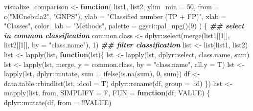 \documentclass[
]{article}
\newenvironment{Shaded}{\begin{snugshade}}{\end{snugshade}}
\newcommand{\AttributeTok}[1]{\textcolor[rgb]{0.77,0.63,0.00}{#1}}
\newcommand{\ControlFlowTok}[1]{\textcolor[rgb]{0.13,0.29,0.53}{\textbf{#1}}}
\newcommand{\DecValTok}[1]{\textcolor[rgb]{0.00,0.00,0.81}{#1}}
\newcommand{\DocumentationTok}[1]{\textcolor[rgb]{0.56,0.35,0.01}{\textbf{\textit{#1}}}}
\newcommand{\FunctionTok}[1]{\textcolor[rgb]{0.00,0.00,0.00}{#1}}
\newcommand{\NormalTok}[1]{#1}
\newcommand{\OtherTok}[1]{\textcolor[rgb]{0.56,0.35,0.01}{#1}}
\newcommand{\SpecialCharTok}[1]{\textcolor[rgb]{0.00,0.00,0.00}{#1}}
\newcommand{\StringTok}[1]{\textcolor[rgb]{0.31,0.60,0.02}{#1}}
\begin{document}
\begin{Shaded}
\begin{Highlighting}[]
\NormalTok{visualize\_comparison }\OtherTok{\textless{}{-}} 
  \ControlFlowTok{function}\NormalTok{(}
\NormalTok{    list1,}
\NormalTok{    list2,}
    \AttributeTok{ylim\_min =} \DecValTok{50}\NormalTok{,}
    \AttributeTok{from =} \FunctionTok{c}\NormalTok{(}\StringTok{"MCnebula2"}\NormalTok{, }\StringTok{"GNPS"}\NormalTok{),}
    \AttributeTok{ylab =} \StringTok{"Classified number (TP + FP)"}\NormalTok{,}
    \AttributeTok{xlab =} \StringTok{"Classes"}\NormalTok{,}
    \AttributeTok{color\_lab =} \StringTok{"Methods"}\NormalTok{,}
    \AttributeTok{palette =}\NormalTok{ ggsci}\SpecialCharTok{::}\FunctionTok{pal\_npg}\NormalTok{()(}\DecValTok{9}\NormalTok{)}
\NormalTok{    )}
\NormalTok{  \{}
    \DocumentationTok{\#\# select in common classification}
\NormalTok{    common.class }\OtherTok{\textless{}{-}}\NormalTok{ dplyr}\SpecialCharTok{::}\FunctionTok{select}\NormalTok{(}\FunctionTok{merge}\NormalTok{(list1[[}\DecValTok{1}\NormalTok{]], list2[[}\DecValTok{1}\NormalTok{]], }\AttributeTok{by =} \StringTok{"class.name"}\NormalTok{), }\DecValTok{1}\NormalTok{)}
    \DocumentationTok{\#\# filter classification}
\NormalTok{    list }\OtherTok{\textless{}{-}} \FunctionTok{list}\NormalTok{(list1, list2)}
\NormalTok{    list }\OtherTok{\textless{}{-}} \FunctionTok{lapply}\NormalTok{(list, }\ControlFlowTok{function}\NormalTok{(lst)\{}
\NormalTok{      lst }\OtherTok{\textless{}{-}} \FunctionTok{lapply}\NormalTok{(lst, dplyr}\SpecialCharTok{::}\NormalTok{select, class.name, sum)}
\NormalTok{      lst }\OtherTok{\textless{}{-}} \FunctionTok{lapply}\NormalTok{(lst, merge, }\AttributeTok{y =}\NormalTok{ common.class, }\AttributeTok{by =} \StringTok{"class.name"}\NormalTok{, }\AttributeTok{all.y =}\NormalTok{ T)}
\NormalTok{      lst }\OtherTok{\textless{}{-}} \FunctionTok{lapply}\NormalTok{(lst, dplyr}\SpecialCharTok{::}\NormalTok{mutate, }\AttributeTok{sum =} \FunctionTok{ifelse}\NormalTok{(}\FunctionTok{is.na}\NormalTok{(sum), }\DecValTok{0}\NormalTok{, sum))}
\NormalTok{      df }\OtherTok{\textless{}{-}}\NormalTok{ data.table}\SpecialCharTok{::}\FunctionTok{rbindlist}\NormalTok{(lst, }\AttributeTok{idcol =}\NormalTok{ T)}
\NormalTok{      dplyr}\SpecialCharTok{::}\FunctionTok{rename}\NormalTok{(df, }\AttributeTok{group =}\NormalTok{ .id)}
\NormalTok{    \})}
\NormalTok{    list }\OtherTok{\textless{}{-}} \FunctionTok{mapply}\NormalTok{(list, from, }\AttributeTok{SIMPLIFY =}\NormalTok{ F,}
      \AttributeTok{FUN =} \ControlFlowTok{function}\NormalTok{(df, VALUE) \{}
\NormalTok{        dplyr}\SpecialCharTok{::}\FunctionTok{mutate}\NormalTok{(df, }\AttributeTok{from =} \SpecialCharTok{!!}\NormalTok{VALUE)}

\end{Highlighting}
\end{Shaded}
\end{document}
